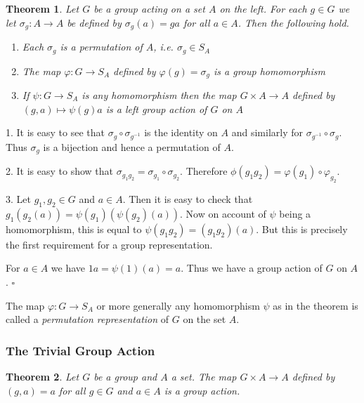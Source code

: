 \documentclass[10pt]{article}
\newtheorem{theorem}{Theorem}[section]
\newenvironment{proof}[1][Proof]{\begin{trivlist}
\item[\hskip \labelsep {\itshape #1}]}{\end{trivlist}}
\newenvironment{definition}[1][Definition]{\begin{trivlist}
\item[\hskip \labelsep {\bfseries #1}]}{\end{trivlist}}
\begin{document}
\begin{theorem}
Let $G$ be a group acting on a set $A$ on the left. For each $g \in G$ we let $\sigma_g : A \to A$ be defined by $\sigma_g(a) = ga$ for all $a \in A$. Then the following hold.
\begin{enumerate}
\item Each $\sigma_g$ is a permutation of $A$, i.e. $\sigma_g \in S_A$
\item The map $\varphi : G \to S_A$ defined by $\varphi(g) = \sigma_g$ is a group homomorphism
\item If $\psi : G \to S_A$ is any homomorphism then the map $G\times A \to A$ defined by $(g, a) \mapsto \psi(g)a$ is a left group action of $G$ on $A$
\end{enumerate}
\end{theorem}

\begin{proof}
1. It is easy to see that $\sigma_g\circ \sigma_{g^{-1}}$ is the identity on $A$ and similarly for $\sigma_{g^{-1}}\circ \sigma_g$. Thus $\sigma_g$ is a bijection and hence a permutation of $A$.

2. It is easy to show that $\sigma_{g_1g_2} = \sigma_{g_1}\circ\sigma_{g_2}$. Therefore $\phi(g_1g_2) = \varphi(g_1)\circ\varphi_{g_2}$.

3. Let $g_1, g_2 \in G$ and $a \in A$. Then it is easy to check that $g_1(g_2(a)) = \psi(g_1)(\psi(g_2)(a))$. Now on account of $\psi$ being a homomorphism, this is equal to $\psi(g_1g_2) = (g_1g_2)(a)$. But this is precisely the first requirement for a group representation.

For $a \in A$ we have $1a = \psi(1)(a) = a$. Thus we have a group action of $G$ on $A$. $\square$
\end{proof}

\begin{definition}
The map $\varphi : G \to S_A$ or more generally any homomorphism $\psi$ as in the theorem is called a \emph{permutation representation} of $G$ on the set $A$.
\end{definition}

\subsubsection{The Trivial Group Action}

\begin{theorem}
Let $G$ be a group and $A$ a set. The map $G\times A \to A$ defined by $(g, a) = a$ for all $g \in G$ and $a \in A$ is a group action.
\end{theorem}
\end{document}
